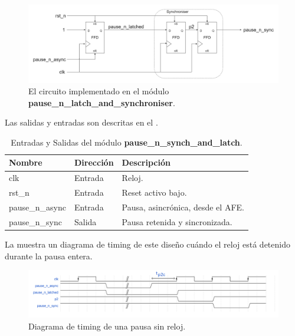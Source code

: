 \documentclass[a4paper, twoside, 11pt]{report}
\begin{document}
\begin{figure}[htb]
  \centering
  \includegraphics[width=1.0\textwidth]{./img/pause_latch_and_synch1_ffd.drawio}
  \caption{\small{El circuito implementado en el módulo \textbf{pause\_n\_latch\_and\_synchroniser}.}}
  \label{fig:pause_n_synch_and_latch}
\end{figure}

Las salidas y entradas son descritas en el .

\begin{table}[htb]
  \centering
  \tablezebra
  \begin{tabulary}{\linewidth}{l|l|L}
    \textbf{Nombre}&\textbf{Dirección}&\textbf{Descripción} \\
    \hline
    clk&Entrada&Reloj. \\
    rst\_n&Entrada&Reset activo bajo. \\
    pause\_n\_async&Entrada&Pausa, asincrónica, desde el AFE. \\
    pause\_n\_sync&Salida &Pausa retenida y sincronizada. \\
  \end{tabulary}
  \caption{Entradas y Salidas del módulo \textbf{pause\_n\_synch\_and\_latch}.}
  \label{tab:ports_pause_n_synch_and_latch}
\end{table}

La  muestra un diagrama de timing de este diseño cuándo el reloj está detenido durante la pausa entera.

\begin{figure}[htb]
  \centering
  \includegraphics[width=1.0\textwidth]{./img/pause_latch_sync_dff_timing_1}
  \caption{Diagrama de timing de una pausa sin reloj.}
  \label{fig:pause_n_synch_and_latch_timing}
\end{figure}
\end{document}
